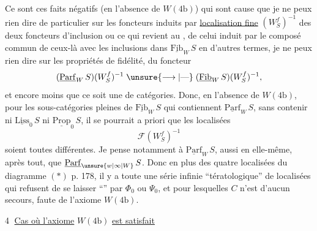Ce sont ces faits  négatifs (en l'absence
de $W(4\mathrm{b})$) qui sont cause que je ne peux rien
dire de particulier sur les foncteurs induits
par \uline{localisation fine} $(W_S^f)^{-1}$ des deux foncteurs
d'inclusion
ou ce qui revient au , de celui induit par le
composé commun de ceux-là avec les inclusions
dans $\underline{\mathrm{Fib}}_W\,S$
en d'autres termes, je ne peux rien dire sur
les propriétés de fidélité,  du foncteur
\[
(\underline{\mathrm{Parf}}_W\,S)(W_S^f)^{-1}\mathrel{\unsure{\longrightarrow|\text{---}}}
(\underline{\mathrm{Fib}}_W\,S)(W_S^f)^{-1},
\]
et encore moins que ce soit une  de
catégories. Donc, en l'absence de $W(4\mathrm{b})$,
pour les sous-catégories pleines  de $\underline{\mathrm{Fib}}_W\,S$ qui
contiennent $\underline{\mathrm{Parf}}_W\,S$, sans contenir ni $\underline{\mathrm{Liss}}_0\,S$ ni
$\underline{\mathrm{Prop}}_0\,S$, il se pourrait a priori que les
localisées
\[
\mathcal{F}(W_S^f)^{-1}
\]
soient toutes différentes. Je pense notamment
à $\underline{\mathrm{Parf}}_W\,S$, aussi  en elle-même, après
tout, que $\underline{\mathrm{Parf}}_{\unsure{w|\infty|W}}\,S$. Donc en plus des quatre
localisées du diagramme $(*)$ p. 178, il y a toute
une série infinie ``tératologique'' de localisées
qui refusent de se laisser ``'' par $\Phi_0$ ou $\Psi_0$, et
pour lesquelles  $C$ n'est d'aucun secours,
faute de l'axiome $W(4\mathrm{b})$.

\textcircled{4} \uline{Cas où l'axiome} $W(4\mathrm{b})$ \uline{est satisfait}

